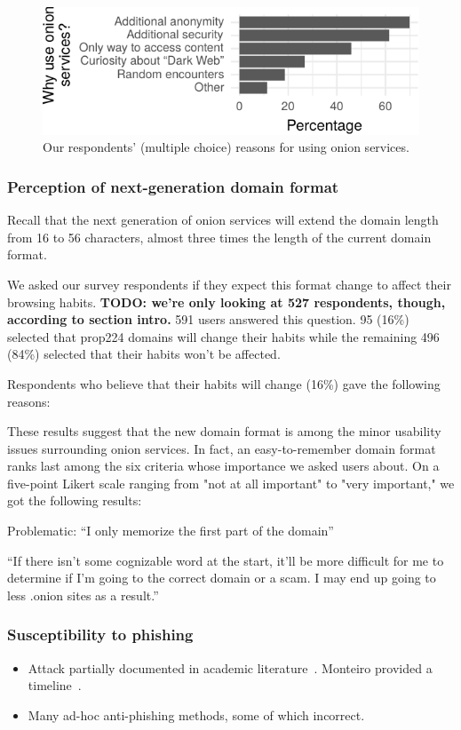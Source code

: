 \begin{figure}[t]
    \centering
    \includegraphics[width=\linewidth]{figures/onion-usage.pdf}
    \caption{Our respondents' (multiple choice) reasons for using onion
    services.}
    \label{fig:onion-usage}
\end{figure}

\subsubsection{Perception of next-generation domain format}

Recall that the next generation of onion services will extend the domain length
from 16 to 56 characters, almost three times the length of the current domain
format.

We asked our survey respondents if they expect this format change to affect
their browsing habits.  \textbf{TODO: we're only looking at 527 respondents, though, according to section intro.} 591 users answered this question.  95 (16\%) selected
that prop224 domains will change their habits while the remaining 496 (84\%)
selected that their habits won't be affected.

Respondents who believe that their habits will change (16\%) gave the
following reasons:

These results suggest that the new domain format is among the
minor usability issues surrounding onion services.  In fact, an
easy-to-remember domain format ranks last among the six criteria whose
importance we asked users about.  On a five-point Likert scale ranging
from "not at all important" to "very important," we got the following
results:

Problematic:
``I only memorize the first part of the domain''

``If there isn't some cognizable word at the start, it'll be more difficult for
me to determine if I'm going to the correct domain or a scam. I may end up going
to less .onion sites as a result.''

\subsubsection{Susceptibility to phishing}
\begin{itemize}
    \item Attack partially documented in academic
        literature~\cite[\S~5.1]{Winter2016a}.  Monteiro provided a
        timeline~\cite{Monteiro2016a}.
    \item Many ad-hoc anti-phishing methods, some of which incorrect.
\end{itemize}

